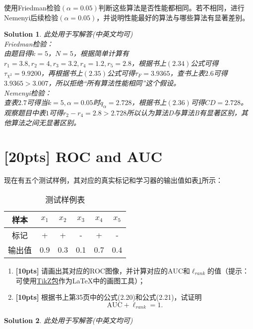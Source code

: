 \documentclass[a4paper,UTF8]{article}
\numberwithin{equation}{section}
\newtheorem*{mySol}{Solution}
\begin{document}
使用Friedman检验$(\alpha=0.05)$判断这些算法是否性能都相同。若不相同，进行Nemenyi后续检验$(\alpha=0.05)$，并说明性能最好的算法与哪些算法有显著差别。
\begin{mySol}
此处用于写解答(中英文均可)\\
Friedman检验：\\
由题目得$k=5$，$N=5$，根据简单计算有$r_1=3.8, r_2=4, r_3=3.2, r_4=1.2, r_5=2.8$，根据书上$(2.34)$公式可得$\tau_{\chi^2} = 9.9200$，再根据书上$(2.35)$公式可得$\tau_F=3.9365$，查书上表$2.6$可得$3.9365 > 3.007 $，所以拒绝“所有算法性能相同”这个假设。\\
Nemenyi检验：\\
查表$2.7$可得当$k=5,\alpha=0.05$时$q_\alpha=2.728$，根据书上$(2.36)$可得$CD = 2.728$。观察题目中表$1$可得$r_2-r_4 = 2.8>2.728$所以认为算法D与算法B有显著区别，其他算法之间无显著区别。
\end{mySol}

\newpage
\section{[20pts] ROC and AUC}
现在有五个测试样例，其对应的真实标记和学习器的输出值如表\ref{table:roc}所示：
\begin{table}[!h]
	\centering
	\caption{测试样例表} \vspace{2mm}\label{table:roc}
	\begin{tabular}{c|c c c c c}\hline
		样本 & $x_1$ & $x_2$ & $x_3$  & $x_4$  & $x_5$ \\
		\hline
		标记 & +  & + &  - &  +  & -\\
		\hline
		输出值 & 0.9  & 0.3 &  0.1 &  0.7  & 0.4\\
		\hline
	\end{tabular}
\end{table}
\begin{enumerate}[ {(}1{)}]
\item \textbf{[10pts]} 请画出其对应的ROC图像，并计算对应的$\mbox{AUC}$和$\ell_{rank}$的值（提示：可使用\href{https://en.wikibooks.org/wiki/LaTeX/PGF/TikZ}{TikZ包}作为\LaTeX 中的画图工具）；
\item \textbf{[10pts]} 根据书上第35页中的公式(2.20)和公式(2.21)，试证明\[\mbox{AUC}+\ell_{rank}=1.\]
\end{enumerate}
\begin{mySol}
此处用于写解答(中英文均可)
~\\
~\\
~\\
~\\
~\\
\end{mySol}
\end{document}

